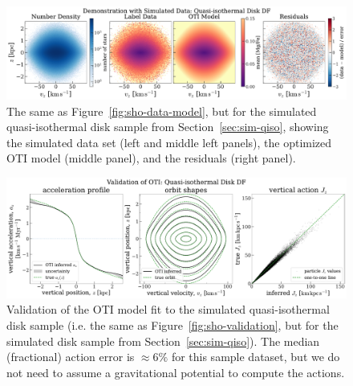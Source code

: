 \documentclass[modern]{aastex631}
\begin{document}
\begin{figure}[t!]
\begin{center}
\includegraphics[width=\textwidth]{qiso-data-model.pdf}
\end{center}
\caption{%
The same as Figure~\ref{fig:sho-data-model}, but for the simulated quasi-isothermal disk
sample from Section~\ref{sec:sim-qiso}, showing the simulated data set (left and middle
left panels), the optimized OTI model (middle panel), and the residuals (right panel).
\label{fig:qiso-data-model}
}
\end{figure}

\begin{figure}[t!]
\begin{center}
\includegraphics[width=\textwidth]{qiso-validation.pdf}
\end{center}
\caption{%
Validation of the OTI model fit to the simulated quasi-isothermal disk sample (i.e. the
same as Figure~\ref{fig:sho-validation}, but for the simulated disk sample from
Section~\ref{sec:sim-qiso}).
The median (fractional) action error is $\approx 6\%$ for this sample dataset, but we do
not need to assume a gravitational potential to compute the actions.
\label{fig:qiso-validation}
}
\end{figure}
\end{document}
